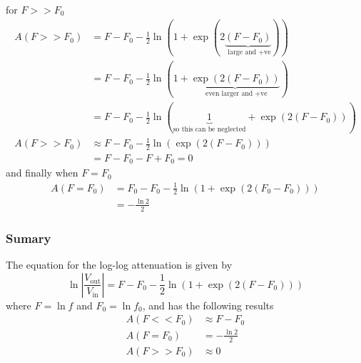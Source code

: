 for $F>>F_0$
\begin{align}
  A(F>>F_0) &= F - F_0  -\frac{1}{2} \ln\left(1+\exp(2\underbrace{(F - F_0)}_{\text{ large and +ve}})\right) \nonumber \\
  &= F - F_0 -\frac{1}{2} \ln\left(1+\underbrace{\exp(2(F - F_0))}_{\text{ even larger and +ve}}\right) \nonumber \\
  &= F - F_0  -\frac{1}{2} \ln\left(\underbrace{1}_{\text{so this can be neglected}}+\exp(2(F - F_0))\right) \nonumber \\
  A(F>>F_0) &\approx F - F_0  -\frac{1}{2} \ln\left(\exp(2(F - F_0))\right) \nonumber \\
  &= F - F_0 -F + F_0 = 0 \label{eq:RL_log_log_large_F}
\end{align}
and finally when $F=F_0$
\begin{align}
  A(F=F_0) &= F_0 - F_0  -\frac{1}{2} \ln\left(1+\exp( 2(F_0 - F_0) )\right) \nonumber \\
  &=  -\frac{\ln 2}{2}  \label{eq:RL_log_log_equal}
\end{align}

\begin{framed}
\subsubsection*{Sumary}
The equation for the log-log attenuation is given by
\begin{equation*}
\ln \left|\frac{V_{\text{out}}}{V_{\text{in}}} \right| = F - F_0  -\frac{1}{2} \ln\left(1+\exp( 2(F - F_0) )\right)
\end{equation*}
where $F=\ln f$ and $F_0 = \ln f_0$, and has the following results
\begin{align*}
   A(F<<F_0) &\approx F - F_0 \\
   A(F=F_0) &= -\frac{\ln 2}{2} \\
   A(F>>F_0) &\approx 0
\end{align*}
\end{framed}
